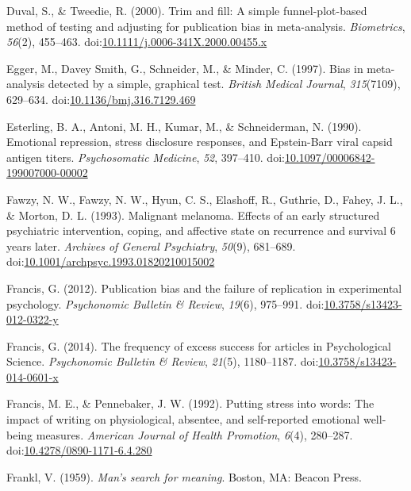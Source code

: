 \documentclass[english,man]{apa6}
\theoremstyle{definition}
\theoremstyle{definition}
\theoremstyle{definition}
\theoremstyle{remark}
\begin{document}
\hypertarget{ref-Duval2000}{}
Duval, S., \& Tweedie, R. (2000). Trim and fill: A simple
funnel-plot-based method of testing and adjusting for publication bias
in meta-analysis. \emph{Biometrics}, \emph{56}(2), 455--463.
doi:\href{https://doi.org/10.1111/j.0006-341X.2000.00455.x}{10.1111/j.0006-341X.2000.00455.x}

\hypertarget{ref-Egger1997}{}
Egger, M., Davey Smith, G., Schneider, M., \& Minder, C. (1997). Bias in
meta-analysis detected by a simple, graphical test. \emph{British
Medical Journal}, \emph{315}(7109), 629--634.
doi:\href{https://doi.org/10.1136/bmj.316.7129.469}{10.1136/bmj.316.7129.469}

\hypertarget{ref-Esterling1990}{}
Esterling, B. A., Antoni, M. H., Kumar, M., \& Schneiderman, N. (1990).
Emotional repression, stress disclosure responses, and Epstein-Barr
viral capsid antigen titers. \emph{Psychosomatic Medicine}, \emph{52},
397--410.
doi:\href{https://doi.org/10.1097/00006842-199007000-00002}{10.1097/00006842-199007000-00002}

\hypertarget{ref-Fawzy1993}{}
Fawzy, N. W., Fawzy, N. W., Hyun, C. S., Elashoff, R., Guthrie, D.,
Fahey, J. L., \& Morton, D. L. (1993). Malignant melanoma. Effects of an
early structured psychiatric intervention, coping, and affective state
on recurrence and survival 6 years later. \emph{Archives of General
Psychiatry}, \emph{50}(9), 681--689.
doi:\href{https://doi.org/10.1001/archpsyc.1993.01820210015002}{10.1001/archpsyc.1993.01820210015002}

\hypertarget{ref-Francis2012}{}
Francis, G. (2012). Publication bias and the failure of replication in
experimental psychology. \emph{Psychonomic Bulletin \& Review},
\emph{19}(6), 975--991.
doi:\href{https://doi.org/10.3758/s13423-012-0322-y}{10.3758/s13423-012-0322-y}

\hypertarget{ref-Francis2014}{}
Francis, G. (2014). The frequency of excess success for articles in
Psychological Science. \emph{Psychonomic Bulletin \& Review},
\emph{21}(5), 1180--1187.
doi:\href{https://doi.org/10.3758/s13423-014-0601-x}{10.3758/s13423-014-0601-x}

\hypertarget{ref-Francis1992}{}
Francis, M. E., \& Pennebaker, J. W. (1992). Putting stress into words:
The impact of writing on physiological, absentee, and self-reported
emotional well-being measures. \emph{American Journal of Health
Promotion}, \emph{6}(4), 280--287.
doi:\href{https://doi.org/10.4278/0890-1171-6.4.280}{10.4278/0890-1171-6.4.280}

\hypertarget{ref-Frankl1959}{}
Frankl, V. (1959). \emph{Man's search for meaning}. Boston, MA: Beacon
Press.
\end{document}
